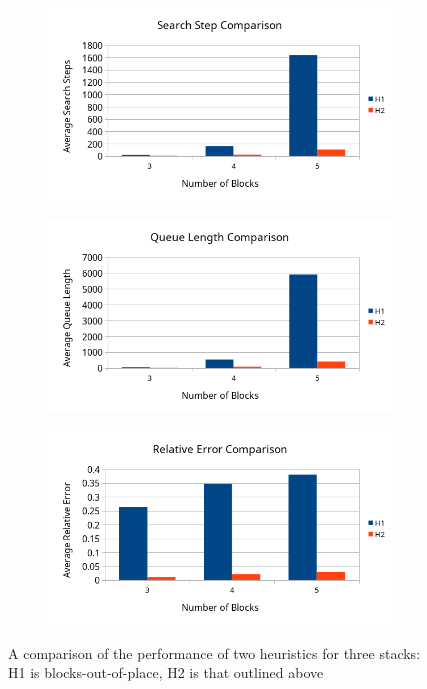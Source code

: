 \documentclass{article}
\begin{document}
\begin{figure}[h]
    \centering
    \begin{subfigure}{\linewidth}
	\centering
	\includegraphics[width=.65\linewidth]{H1vsH2_AvgSteps.png}\hfill
	\caption{}
    \end{subfigure}\par\medskip
    \begin{subfigure}{\linewidth}
	\centering
	\includegraphics[width=.65\linewidth]{H1vsH2_AvgQL.png}\hfill
	\caption{}
    \end{subfigure}\par\medskip
    \begin{subfigure}{\linewidth}
	\centering
	\includegraphics[width=.65\linewidth]{H1vsH2_AvgRelErr.png}\hfill
	\caption{}
    \end{subfigure}
    \caption{A comparison of the performance of two heuristics for three
    stacks: H1 is blocks-out-of-place, H2 is that outlined above }
    \label{fig:comparison}
\end{figure}
\end{document}
